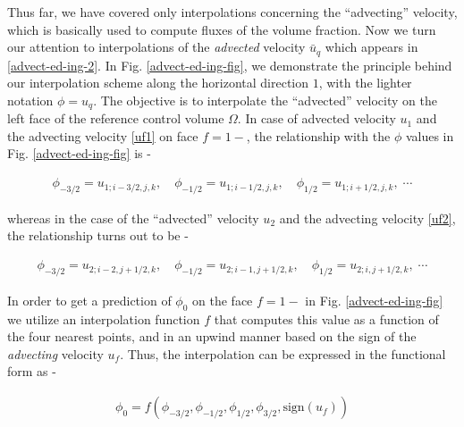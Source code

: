 Thus far, we have covered only interpolations
concerning the ``advecting'' velocity, which is basically
used to compute fluxes of the volume fraction. 
Now we turn our attention to interpolations of the \textit{advected}
velocity $\bar u_{q}$ which appears in \eqref{advect-ed-ing-2}. 
In Fig. \ref{advect-ed-ing-fig}, we demonstrate the principle 
behind our interpolation scheme along the horizontal direction $1$, 
with the lighter notation $\phi = u_q$.
The objective is to interpolate the ``advected'' velocity on the left face
of the reference control volume $\Omega$.
In case of advected velocity $u_1$ and the advecting velocity \eqref{uf1} on face
$f=1-$, the relationship with the $\phi$ values in Fig. \ref{advect-ed-ing-fig} is -


\begin{align}
\phi_{-3/2} = u_{1;i-3/2,j,k}, \quad \phi_{-1/2} = u_{1;i-1/2,j,k}, \quad   
\phi_{1/2} = u_{1;i+1/2,j,k}, \;\cdots
\end{align}


whereas in the case of the ``advected'' velocity $u_2$ and the advecting velocity \eqref{uf2},
the relationship turns out to be -


\begin{align}
\phi_{-3/2} = u_{2;i-2,j+1/2,k}, \quad  \phi_{-1/2} = u_{2;i-1,j+1/2,k}, 
\quad  \phi_{1/2} = u_{2;i,j+1/2,k}, \;\cdots
\end{align}

In order to get a prediction of $\phi_0$ on the 
face $f=1-$ in Fig. \ref{advect-ed-ing-fig}
we utilize an interpolation function $f$ that computes 
this value as a function of the four nearest points,
and in an upwind manner based on the sign of the 
\textit{advecting} velocity $u_f$. Thus, the interpolation
can be expressed in the functional form as - 


\begin{align}
\phi_0 = f \left( \phi_{-3/2}, \phi_{-1/2}, \phi_{1/2},\phi_{3/2},\textrm{sign}(u_f) \right)
\label{simpleinterp}
\end{align}


